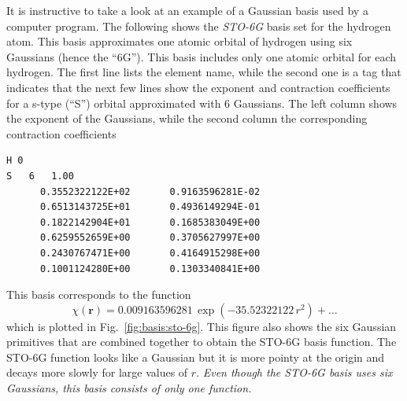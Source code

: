 \documentclass[../Main/notes.tex]{subfiles}
\begin{document}
It is instructive to take a look at an example of a Gaussian basis used by a computer program.
The following shows the \emph{STO-6G} basis set for the hydrogen atom. This basis approximates one atomic orbital of hydrogen using six Gaussians (hence the ``6G'').
This basis includes only one atomic orbital for each hydrogen.
The first line lists the element name, while the second one is a tag that indicates that the next few lines show the exponent and contraction coefficients for a s-type (``S'') orbital approximated with 6 Gaussians.
The left column shows the exponent of the Gaussians, while the second column the corresponding contraction coefficients
\begin{verbatim}
H 0
S   6   1.00
      0.3552322122E+02       0.9163596281E-02
      0.6513143725E+01       0.4936149294E-01
      0.1822142904E+01       0.1685383049E+00
      0.6259552659E+00       0.3705627997E+00
      0.2430767471E+00       0.4164915298E+00
      0.1001124280E+00       0.1303340841E+00
\end{verbatim}

This basis corresponds to the function
\begin{equation}
\chi(\mathbf{r}) = 
0.009163596281 \, \exp(-35.52322122 \, r^2)
+ \ldots
\end{equation}
which is plotted in Fig.~\ref{fig:basis:sto-6g}.
This figure also shows the six Gaussian primitives that are combined together to obtain the STO-6G basis function.
The STO-6G function looks like a Gaussian but it is more pointy at the origin and decays more slowly for large values of $r$.
\emph{Even though the STO-6G basis uses six Gaussians, this basis consists of only one function.}
\end{document}

